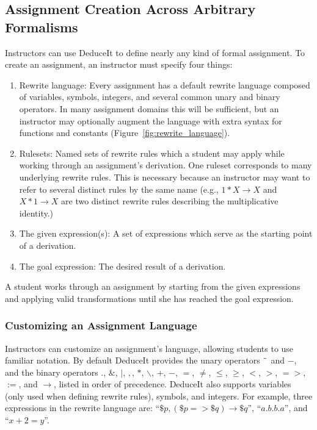 \documentclass{sigchi}
\newcommand{\msb}[1]{\textbf{\textcolor{cyan}{Michael: #1}}}
\begin{document}
\subsection{Assignment Creation Across Arbitrary Formalisms}

Instructors can use DeduceIt to define nearly any kind of formal assignment. To create an assignment, an instructor must specify four things: 
  \begin{enumerate}
  \item Rewrite language: Every assignment has a default rewrite language composed of variables, symbols, integers, and several common unary and binary operators. In many assignment domains this will be sufficient, but an instructor may optionally augment the language with extra syntax for functions and constants (Figure~\ref{fig:rewrite_language}). 
  \item Rulesets: Named sets of rewrite rules which a student may apply while working through an assignment's derivation. One ruleset corresponds to many underlying rewrite rules. This is necessary because an instructor may want to refer to several distinct rules by the same name (e.g., $1*X \rightarrow X$ and $X*1 \rightarrow X$ are two distinct rewrite rules describing the multiplicative identity.)
  \item The given expression(s): A set of expressions which serve as the starting point of a derivation.
  \item The goal expression: The desired result of a derivation.
  \end{enumerate}

A student works through an assignment by starting from the given expressions and applying valid transformations until she has reached the goal expression. %

\subsubsection{Customizing an Assignment Language}

Instructors can customize an assignment's language, allowing students to use familiar notation. By default DeduceIt provides the unary operators $\char`\~$ and $-$, and the binary operators $.$, $\&$, $|$, $,$, $*$, $\backslash$, $+$, $-$, $=$, $\neq$, $\leq$, $\geq$, $<$, $>$, $=>$, $:=$, and $\rightarrow$, listed in order of precedence. DeduceIt also supports variables (only used when defining rewrite rules), symbols, and integers. For example, three expressions in the rewrite language are: ``$\$p,(\$p=>\$q)\rightarrow{}\$q$'', ``$a.b.b.a$'', and ``$x+2=y$''.
\end{document}
